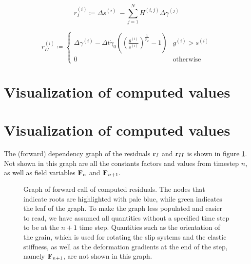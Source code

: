 \documentclass{article}
\begin{document}
\begin{equation}
    r_I^{(i)} \coloneqq \Delta s^{(i)}\ - \sum_{j=1}^N H^{(i,j)} \Delta \gamma^{(j)}
\end{equation}


\begin{equation}
    r_{II}^{(i)} \coloneqq
    \begin{cases}
        \Delta {\gamma}^{(i)} - \Delta t \dot{\gamma}_0
        \left( \left( \frac{g^{(i)}}{s^{(i)}}\right)^{\frac{1}{p_F}} - 1 \right) & g^{(i)} > s^{(i)}\\
        0 & \text{otherwise}
    \end{cases}
\end{equation}


\section{Visualization of computed values}

\section{Visualization of computed values}

The (forward) dependency graph of the residuals ${\bf r}_I$ and ${\bf r}_{II}$ is shown in figure \ref{fig:compu-graph}. 
Not shown in this graph are all the constants factors and values from timestep $n$, as well as field variables ${\bf F}_n$ and ${\bf F}_{n+1}$.

%     

\begin{figure}
    
    \caption{Graph of forward call of computed residuals. The nodes that indicate roots are highlighted with pale blue, 
    while green indicates the leaf of the graph. To make the graph less populated 
    and easier to read, we have assumed all quantities without a specified time step to be at the $n+1$ time step.
    Quantities such as the orientation of the grain, which is used for rotating the slip systems and the elastic stiffness, 
    as well as the deformation gradients at the end of the step, namely ${\bf F}_{n+1}$, are not shown in this graph.
    }
    \label{fig:compu-graph}
\end{figure}
\end{document}
